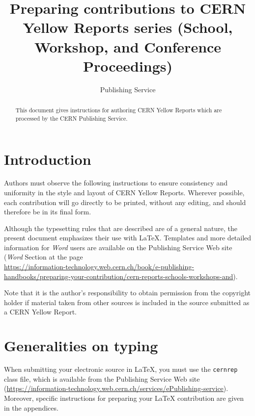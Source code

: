\documentclass{cernrep}
\begin{document}
\title{Preparing contributions to CERN Yellow Reports series (School, Workshop, and
Conference Proceedings)}
 
\author {Publishing Service}


\begin{abstract}
This document gives instructions for authoring CERN Yellow Reports which are processed by the CERN Publishing Service.
\end{abstract}


\maketitle %
 
\section{Introduction}
 
Authors must observe the following instructions to ensure consistency
and uniformity in the style and layout of CERN Yellow Reports.  Wherever
possible, each contribution will go directly to be printed, without
any editing, and should therefore be in its final form.

Although the typesetting rules that are described are of a general
nature, the present document emphasizes their use with
\LaTeX. Templates and more detailed information for \emph{Word} users
are available on the Publishing Service Web site (\emph{Word} Section at the page\\
\url{https://information-technology.web.cern.ch/book/e-publishing-handbooks/preparing-your-contribution/cern-reports-schools-workshops-and}).
 
Note that it is the author's responsibility to obtain permission from
the copyright holder if material taken from other sources is included
in the source submitted as a CERN Yellow Report.

\section{Generalities on typing}

When submitting your electronic source in \LaTeX{}, you must use the
\texttt{cernrep} class file, which is available from the Publishing Service Web site
(\url{https://information-technology.web.cern.ch/services/ePublishing-service}). Moreover, specific instructions for preparing
your \LaTeX{} contribution are given in the appendices.
\end{document}
